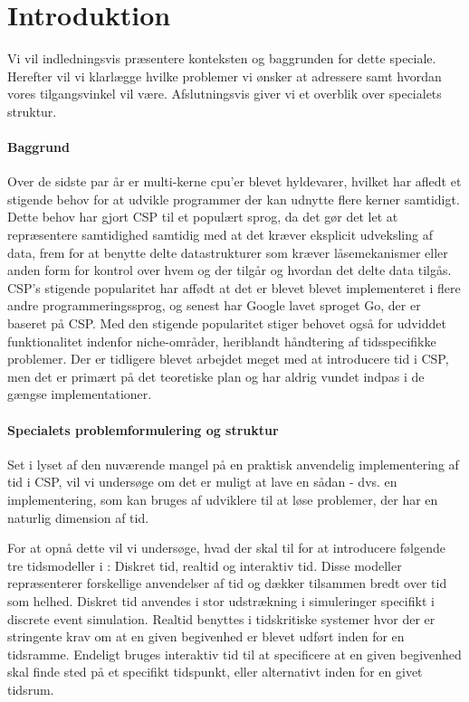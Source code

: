 \chapter{Introduktion}
Vi vil indledningsvis præsentere konteksten og baggrunden for dette speciale. Herefter vil vi klarlægge hvilke problemer vi ønsker at adressere samt hvordan vores tilgangsvinkel vil være. Afslutningsvis giver vi et overblik over specialets struktur. 

\subsubsection{Baggrund}
Over de sidste par år er multi-kerne cpu'er blevet hyldevarer, hvilket har afledt et stigende behov for at udvikle programmer der kan udnytte flere kerner samtidigt. Dette behov har gjort CSP til et populært sprog, da det gør det let at repræsentere samtidighed samtidig med at det kræver eksplicit udveksling af data, frem for at benytte delte datastrukturer som kræver låsemekanismer eller anden form for kontrol over hvem og der tilgår og hvordan det delte data tilgås. CSP's stigende popularitet har affødt at det er blevet blevet implementeret i flere andre programmeringssprog, og senest har Google lavet sproget Go, der er baseret på CSP. Med den stigende popularitet stiger behovet også for udviddet funktionalitet indenfor niche-områder, heriblandt håndtering af tidsspecifikke problemer. Der er tidligere blevet arbejdet meget med at introducere tid i CSP, men det er primært på det teoretiske plan og har aldrig vundet indpas i de gængse implementationer. 

\subsubsection{Specialets problemformulering og struktur}
Set i lyset af den nuværende mangel på en praktisk anvendelig implementering af tid i CSP, vil vi undersøge om det er muligt at lave en sådan - dvs. en implementering, som kan bruges af udviklere til at løse problemer, der har en naturlig dimension af tid.

For at opnå dette vil vi undersøge, hvad der skal til for at introducere følgende tre tidsmodeller i \pycsp: Diskret tid, realtid og interaktiv tid. Disse modeller repræsenterer forskellige anvendelser af tid og dækker tilsammen bredt over tid som helhed. Diskret tid anvendes i stor udstrækning i simuleringer specifikt i discrete event simulation. Realtid benyttes i tidskritiske systemer hvor der er stringente krav om at en given begivenhed er blevet udført inden for en tidsramme. Endeligt bruges interaktiv tid til at specificere at en given begivenhed skal finde sted på et specifikt tidspunkt, eller alternativt inden for en givet tidsrum. 

